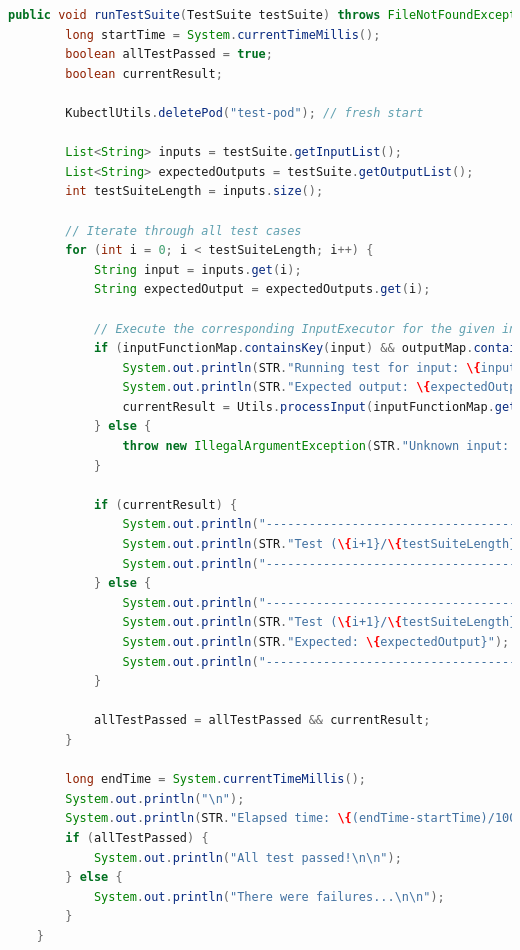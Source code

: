 \documentclass[main.tex]{subfiles}
\begin{document}
\begin{lstlisting}[language=Java]
public void runTestSuite(TestSuite testSuite) throws FileNotFoundException, URISyntaxException, InterruptedException {
        long startTime = System.currentTimeMillis();
        boolean allTestPassed = true;
        boolean currentResult;

        KubectlUtils.deletePod("test-pod"); // fresh start

        List<String> inputs = testSuite.getInputList();
        List<String> expectedOutputs = testSuite.getOutputList();
        int testSuiteLength = inputs.size();

        // Iterate through all test cases
        for (int i = 0; i < testSuiteLength; i++) {
            String input = inputs.get(i);
            String expectedOutput = expectedOutputs.get(i);

            // Execute the corresponding InputExecutor for the given input
            if (inputFunctionMap.containsKey(input) && outputMap.containsKey(expectedOutput)) {
                System.out.println(STR."Running test for input: \{input}");
                System.out.println(STR."Expected output: \{expectedOutput}");
                currentResult = Utils.processInput(inputFunctionMap.get(input), outputMap.get(expectedOutput));
            } else {
                throw new IllegalArgumentException(STR."Unknown input: \{input}");
            }

            if (currentResult) {
                System.out.println("--------------------------------------------------");
                System.out.println(STR."Test (\{i+1}/\{testSuiteLength}) passed for input: \{input}");
                System.out.println("--------------------------------------------------");
            } else {
                System.out.println("--------------------------------------------------");
                System.out.println(STR."Test (\{i+1}/\{testSuiteLength}) failed for input: \{input}");
                System.out.println(STR."Expected: \{expectedOutput}");
                System.out.println("--------------------------------------------------");
            }

            allTestPassed = allTestPassed && currentResult;
        }

        long endTime = System.currentTimeMillis();
        System.out.println("\n");
        System.out.println(STR."Elapsed time: \{(endTime-startTime)/1000} s");
        if (allTestPassed) {
            System.out.println("All test passed!\n\n");
        } else {
            System.out.println("There were failures...\n\n");
        }
    }

\end{lstlisting}
\end{document}
